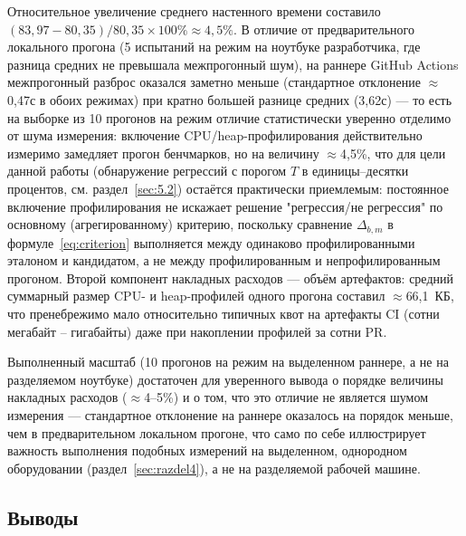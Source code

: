 \documentclass[12pt,a4paper]{article}
\numberwithin{equation}{section}
\begin{document}
Относительное увеличение среднего настенного времени составило
$(83{,}97 - 80{,}35)/80{,}35 \times 100\% \approx 4{,}5\%$. В отличие от
предварительного локального прогона (5 испытаний на режим на ноутбуке
разработчика, где разница средних не превышала межпрогонный шум), на
раннере GitHub Actions межпрогонный разброс оказался заметно меньше
(стандартное отклонение $\approx$0,47с в обоих режимах) при кратно большей
разнице средних (3,62с) — то есть на выборке из 10 прогонов на режим
отличие статистически уверенно отделимо от шума измерения: включение
CPU/heap-профилирования действительно измеримо замедляет прогон
бенчмарков, но на величину $\approx$4,5\%, что для цели данной работы
(обнаружение регрессий с порогом $T$ в единицы--десятки процентов, см.
раздел~\ref{sec:5.2}) остаётся практически приемлемым: постоянное
включение профилирования не искажает решение "регрессия/не регрессия" по
основному (агрегированному) критерию, поскольку сравнение
$\Delta_{b,m}$ в формуле~\eqref{eq:criterion} выполняется между
одинаково профилированными эталоном и кандидатом, а не между
профилированным и непрофилированным прогоном. Второй компонент накладных
расходов — объём артефактов: средний суммарный размер CPU- и
heap-профилей одного прогона составил $\approx$66,1~КБ, что
пренебрежимо мало относительно типичных квот на артефакты CI (сотни
мегабайт -- гигабайты) даже при накоплении профилей за сотни PR.

Выполненный масштаб (10 прогонов на режим на выделенном раннере, а не на
разделяемом ноутбуке) достаточен для уверенного вывода о порядке величины
накладных расходов ($\approx$4--5\%) и о том, что это отличие не является
шумом измерения — стандартное отклонение на раннере оказалось на порядок
меньше, чем в предварительном локальном прогоне, что само по себе
иллюстрирует важность выполнения подобных измерений на выделенном,
однородном оборудовании (раздел~\ref{sec:razdel4}), а не на разделяемой
рабочей машине.

\subsection{Выводы}
\label{sec:5.4}
\end{document}
